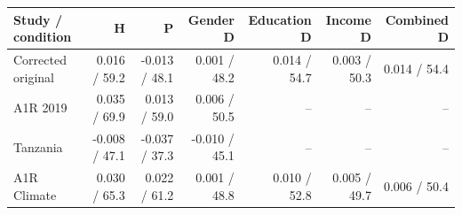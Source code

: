 
\begin{tabular}{lrrrrrr}
\toprule
Study / condition & H & P & Gender D & Education D & Income D & Combined D\\
\midrule
Corrected original & 0.016 / 59.2 & -0.013 / 48.1 & 0.001 / 48.2 & 0.014 / 54.7 & 0.003 / 50.3 & 0.014 / 54.4\\
A1R 2019 & 0.035 / 69.9 & 0.013 / 59.0 & 0.006 / 50.5 & -- & -- & --\\
Tanzania & -0.008 / 47.1 & -0.037 / 37.3 & -0.010 / 45.1 & -- & -- & --\\
A1R Climate & 0.030 / 65.3 & 0.022 / 61.2 & 0.001 / 48.8 & 0.010 / 52.8 & 0.005 / 49.7 & 0.006 / 50.4\\
\bottomrule
\end{tabular}
